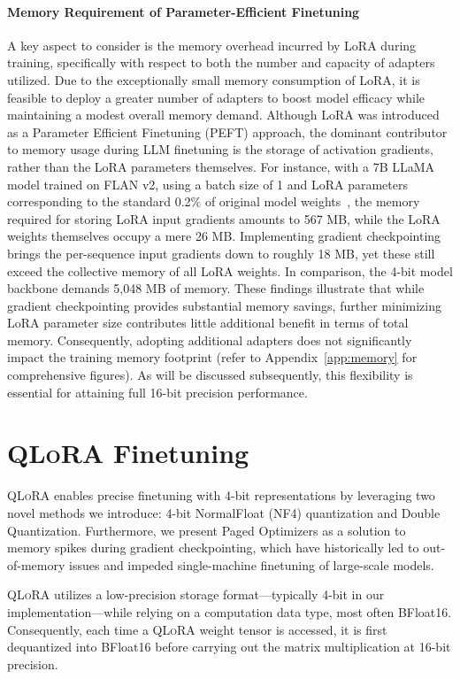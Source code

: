 \paragraph{Memory Requirement of Parameter-Efficient Finetuning} A key aspect to consider is the memory overhead incurred by LoRA during training, specifically with respect to both the number and capacity of adapters utilized. Due to the exceptionally small memory consumption of LoRA, it is feasible to deploy a greater number of adapters to boost model efficacy while maintaining a modest overall memory demand. Although LoRA was introduced as a Parameter Efficient Finetuning (PEFT) approach, the dominant contributor to memory usage during LLM finetuning is the storage of activation gradients, rather than the LoRA parameters themselves. For instance, with a 7B LLaMA model trained on FLAN v2, using a batch size of 1 and LoRA parameters corresponding to the standard 0.2\% of original model weights~\citep{hu2021lora,liu2022few}, the memory required for storing LoRA input gradients amounts to 567 MB, while the LoRA weights themselves occupy a mere 26 MB. Implementing gradient checkpointing~\citep{chen2016training} brings the per-sequence input gradients down to roughly 18 MB, yet these still exceed the collective memory of all LoRA weights. In comparison, the 4-bit model backbone demands 5,048 MB of memory. These findings illustrate that while gradient checkpointing provides substantial memory savings, further minimizing LoRA parameter size contributes little additional benefit in terms of total memory. Consequently, adopting additional adapters does not significantly impact the training memory footprint (refer to Appendix~\ref{app:memory} for comprehensive figures). As will be discussed subsequently, this flexibility is essential for attaining full 16-bit precision performance.

\section{\textsc{QLoRA} Finetuning}

\textsc{QLoRA} enables precise finetuning with 4-bit representations by leveraging two novel methods we introduce: 4-bit NormalFloat (NF4) quantization and Double Quantization. Furthermore, we present Paged Optimizers as a solution to memory spikes during gradient checkpointing, which have historically led to out-of-memory issues and impeded single-machine finetuning of large-scale models.

\textsc{QLoRA} utilizes a low-precision storage format—typically 4-bit in our implementation—while relying on a computation data type, most often BFloat16. Consequently, each time a \textsc{QLoRA} weight tensor is accessed, it is first dequantized into BFloat16 before carrying out the matrix multiplication at 16-bit precision.

